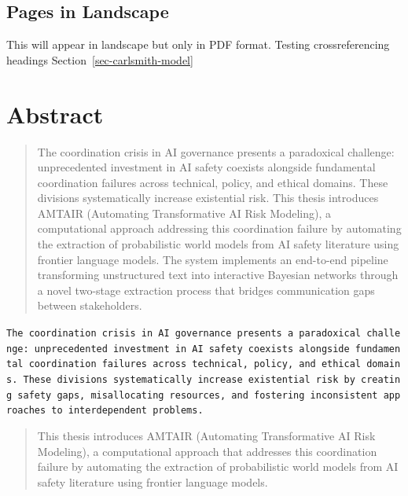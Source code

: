 \documentclass[
  11pt,
  letterpaper,
]{book}
\begin{document}
\section*{Pages in Landscape}\label{pages-in-landscape}


\begin{landscape}

This will appear in landscape but only in PDF format. Testing
crossreferencing headings Section~\ref{sec-carlsmith-model}

\end{landscape}


\chapter*{Abstract}\label{sec-abstract}


\begin{quote}
The coordination crisis in AI governance presents a paradoxical
challenge: unprecedented investment in AI safety coexists alongside
fundamental coordination failures across technical, policy, and ethical
domains. These divisions systematically increase existential risk. This
thesis introduces AMTAIR (Automating Transformative AI Risk Modeling), a
computational approach addressing this coordination failure by
automating the extraction of probabilistic world models from AI safety
literature using frontier language models. The system implements an
end-to-end pipeline transforming unstructured text into interactive
Bayesian networks through a novel two-stage extraction process that
bridges communication gaps between stakeholders.
\end{quote}

\texttt{The\ coordination\ crisis\ in\ AI\ governance\ presents\ a\ paradoxical\ challenge:\ unprecedented\ investment\ in\ AI\ safety\ coexists\ alongside\ fundamental\ coordination\ failures\ across\ technical,\ policy,\ and\ ethical\ domains.\ These\ divisions\ systematically\ increase\ existential\ risk\ by\ creating\ safety\ gaps,\ misallocating\ resources,\ and\ fostering\ inconsistent\ approaches\ to\ interdependent\ problems.}

\begin{quote}
This thesis introduces AMTAIR (Automating Transformative AI Risk
Modeling), a computational approach that addresses this coordination
failure by automating the extraction of probabilistic world models from
AI safety literature using frontier language models.
\end{quote}
\end{document}
